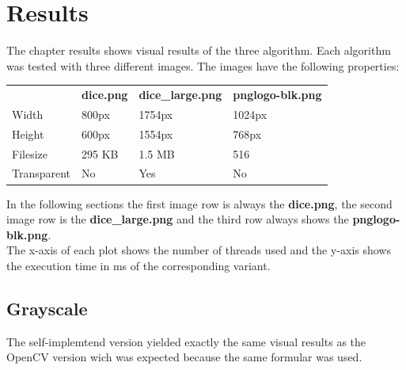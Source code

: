 \chapter{Results}

The chapter results shows visual results of the three algorithm. Each algorithm was tested with three different images. The images have the following properties:


\begin{table}[H]
    \centering
    \begin{tabular}{|l|l|l|l|}
        \hline
        \textbf{}   & \textbf{dice.png} & \textbf{dice\_large.png} & \textbf{pnglogo-blk.png} \\ \hhline{|=|=|=|=|}
        Width       & 800px             & 1754px                   & 1024px                   \\ \hline
        Height      & 600px             & 1554px                   & 768px                    \\ \hline
        Filesize    & 295 KB            & 1.5 MB                   & 516                      \\ \hline
        Transparent & No                & Yes                      & No                       \\ \hline
    \end{tabular}
\end{table}

In the following sections the first image row is always the \textbf{dice.png}, the second image row is the \textbf{dice\_large.png} and the third row always shows the \textbf{pnglogo-blk.png}.\\

The x-axis of each plot shows the number of threads used and the y-axis shows the execution time in ms of the corresponding variant.

\newpage
\section{Grayscale}

The self-implemtend version yielded exactly the same visual results as the OpenCV version wich was expected because the same formular was used.

